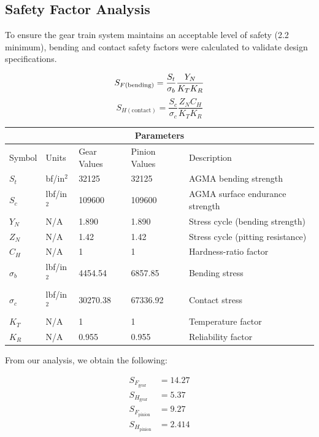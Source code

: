 \documentclass[letterpaper,12pt]{article}
\begin{document}
\subsection{Safety Factor Analysis}
To ensure the gear train system maintains an acceptable level of safety (2.2 minimum), bending and contact safety factors were calculated to validate design specifications.

\begin{equation}
S_{F(\text{bending})} = \frac{S_t}{\sigma_b}\frac{Y_N}{K_T K_R} \\
\end{equation}
\begin{equation}
S_{H(\text{contact})} = \frac{S_c}{\sigma_c}\frac{Z_N C_H}{K_T K_R}
\end{equation}

\begin{center}
	\begin{tabular}{ |p{2cm}||p{2cm}|p{2.3cm}|p{2.3cm}|p{6cm}|  }
		\hline
		\multicolumn{5}{|c|}{Parameters} \\
		\hline
		Symbol & Units & Gear Values & Pinion Values & Description\\
		\hline
		$S_t$ & bf/in$^2$ & 32125 & 32125 & AGMA bending strength\\
		$S_c$ & lbf/in$^2$ & 109600 & 109600 & AGMA surface endurance strength\\
		$Y_N$ & N/A & 1.890 & 1.890 & Stress cycle (bending strength)\\
		$Z_N$ & N/A & 1.42 & 1.42 & Stress cycle (pitting resistance)\\
		$C_H$ & N/A & 1 & 1 & Hardness-ratio factor\\
		$\sigma_b$ & lbf/in$^2$ & 4454.54 & 6857.85 & Bending stress\\
		$\sigma_c$ & lbf/in$^2$ & 30270.38 & 67336.92 & Contact stress\\
		$K_T$ & N/A & 1 & 1 & Temperature factor\\
		$K_R$ & N/A & 0.955 & 0.955 & Reliability factor\\
		\hline
	\end{tabular}
\end{center}

\noindent From our analysis, we obtain the following: 

\begin{align*}
    S_{F_{\text{gear}}} &= 14.27 \\
    S_{H_{\text{gear}}} &= 5.37 \\
    S_{F_{\text{pinion}}} &= 9.27 \\
    S_{H_{\text{pinion}}} &= 2.414
\end{align*}
\end{document}
